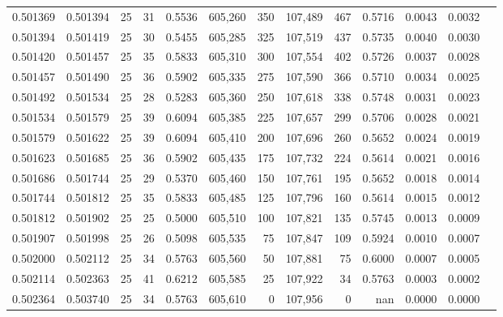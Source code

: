 \begin{tabular}{rrrrrrrrrrrrr}
0.501369 & 0.501394 &    25 &  31 &                                     0.5536 & 605,260 &     350 & 107,489 &     467 & 0.5716 & 0.0043 & 0.0032 \\
0.501394 & 0.501419 &    25 &  30 &                                     0.5455 & 605,285 &     325 & 107,519 &     437 & 0.5735 & 0.0040 & 0.0030 \\
0.501420 & 0.501457 &    25 &  35 &                                     0.5833 & 605,310 &     300 & 107,554 &     402 & 0.5726 & 0.0037 & 0.0028 \\
0.501457 & 0.501490 &    25 &  36 &                                     0.5902 & 605,335 &     275 & 107,590 &     366 & 0.5710 & 0.0034 & 0.0025 \\
0.501492 & 0.501534 &    25 &  28 &                                     0.5283 & 605,360 &     250 & 107,618 &     338 & 0.5748 & 0.0031 & 0.0023 \\
0.501534 & 0.501579 &    25 &  39 &                                     0.6094 & 605,385 &     225 & 107,657 &     299 & 0.5706 & 0.0028 & 0.0021 \\
0.501579 & 0.501622 &    25 &  39 &                                     0.6094 & 605,410 &     200 & 107,696 &     260 & 0.5652 & 0.0024 & 0.0019 \\
0.501623 & 0.501685 &    25 &  36 &                                     0.5902 & 605,435 &     175 & 107,732 &     224 & 0.5614 & 0.0021 & 0.0016 \\
0.501686 & 0.501744 &    25 &  29 &                                     0.5370 & 605,460 &     150 & 107,761 &     195 & 0.5652 & 0.0018 & 0.0014 \\
0.501744 & 0.501812 &    25 &  35 &                                     0.5833 & 605,485 &     125 & 107,796 &     160 & 0.5614 & 0.0015 & 0.0012 \\
0.501812 & 0.501902 &    25 &  25 &                                     0.5000 & 605,510 &     100 & 107,821 &     135 & 0.5745 & 0.0013 & 0.0009 \\
0.501907 & 0.501998 &    25 &  26 &                                     0.5098 & 605,535 &      75 & 107,847 &     109 & 0.5924 & 0.0010 & 0.0007 \\
0.502000 & 0.502112 &    25 &  34 &                                     0.5763 & 605,560 &      50 & 107,881 &      75 & 0.6000 & 0.0007 & 0.0005 \\
0.502114 & 0.502363 &    25 &  41 &                                     0.6212 & 605,585 &      25 & 107,922 &      34 & 0.5763 & 0.0003 & 0.0002 \\
0.502364 & 0.503740 &    25 &  34 &                                     0.5763 & 605,610 &       0 & 107,956 &       0 &    nan & 0.0000 & 0.0000 \\
\bottomrule
\end{tabular}
